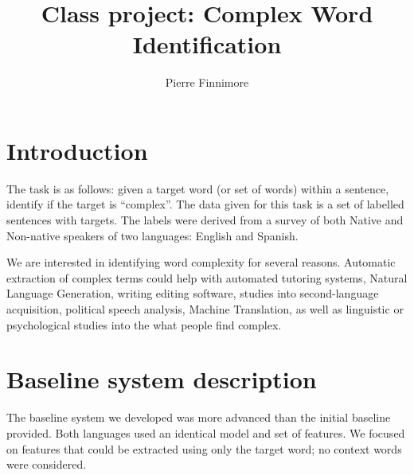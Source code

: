 \documentclass[11pt,a4paper]{article}
\title{Class project: Complex Word Identification}
\author{Pierre Finnimore}
\begin{document}
\maketitle
%

\section{Introduction}

The task is as follows: given a target word (or set of words) within a sentence, identify if the target is \enquote{complex}. The data given for this task is a set of labelled sentences with targets. The labels were derived from a survey of both Native and Non-native speakers of two languages: English and Spanish.

We are interested in identifying word complexity for several reasons. Automatic extraction of complex terms could help with automated tutoring systems, Natural Language Generation, writing editing software, studies into second-language acquisition, political speech analysis, Machine Translation, as well as linguistic or psychological studies into the what people find complex. 

\section{Baseline system description}

The baseline system we developed was more advanced than the initial baseline provided. Both languages used an identical model and set of features. We focused on features that could be extracted using only the target word; no context words were considered.
\end{document}
